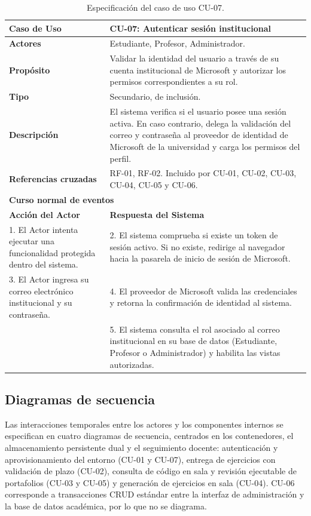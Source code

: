\begin{table}[H]
\centering
\caption{Especificación del caso de uso CU-07.}
\label{tab:cu_07}
\small
\begin{tabular}{p{} p{}}
\toprule
\textbf{Caso de Uso} & \textbf{CU-07: Autenticar sesión institucional} \\
\midrule
\textbf{Actores} & Estudiante, Profesor, Administrador. \\
\textbf{Propósito} & Validar la identidad del usuario a través de su cuenta institucional de Microsoft y autorizar los permisos correspondientes a su rol. \\
\textbf{Tipo} & Secundario, de inclusión. \\
\textbf{Descripción} & El sistema verifica si el usuario posee una sesión activa. En caso contrario, delega la validación del correo y contraseña al proveedor de identidad de Microsoft de la universidad y carga los permisos del perfil. \\
\textbf{Referencias cruzadas} & RF-01, RF-02. Incluido por CU-01, CU-02, CU-03, CU-04, CU-05 y CU-06. \\
\midrule
\multicolumn{2}{l}{\textbf{Curso normal de eventos}} \\
\midrule
\textbf{Acción del Actor} & \textbf{Respuesta del Sistema} \\
\midrule
1. El Actor intenta ejecutar una funcionalidad protegida dentro del sistema. & 2. El sistema comprueba si existe un token de sesión activo. Si no existe, redirige al navegador hacia la pasarela de inicio de sesión de Microsoft. \\
3. El Actor ingresa su correo electrónico institucional y su contraseña. & 4. El proveedor de Microsoft valida las credenciales y retorna la confirmación de identidad al sistema. \\
 & 5. El sistema consulta el rol asociado al correo institucional en su base de datos (Estudiante, Profesor o Administrador) y habilita las vistas autorizadas. \\
\bottomrule
\end{tabular}
\end{table}

\subsection{Diagramas de secuencia}
\label{subsec:diagramas_secuencia}

Las interacciones temporales entre los actores y los componentes internos se especifican en cuatro diagramas de secuencia, centrados en los contenedores, el almacenamiento persistente dual y el seguimiento docente: autenticación y aprovisionamiento del entorno (CU-01 y CU-07), entrega de ejercicios con validación de plazo (CU-02), consulta de código en sala y revisión ejecutable de portafolios (CU-03 y CU-05) y generación de ejercicios en sala (CU-04). CU-06 corresponde a transacciones CRUD estándar entre la interfaz de administración y la base de datos académica, por lo que no se diagrama.

